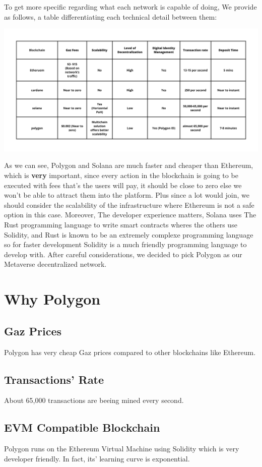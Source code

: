 To get more specific regarding what each network is capable of doing, We provide as follows, a table differentiating each technical detail between them:


\includegraphics[width=1\textwidth, inner]{assets/comparaison.png}

As we can see, Polygon and Solana are much faster and cheaper than Ethereum, which is \textbf{very} important, since every action in the blockchain is going to be executed with fees that's the users will pay, it should be close to zero else we won't be able to attract them into the platform. Plus since a lot would join, we should consider the scalability of the infrastructure where Ethereum is not a safe option in this case. Moreover, The developer experience matters, Solana uses The Rust programming language to write smart contracts wheres the others use Solidity, and Rust is known to be an extremely complexe programming language so for faster development Solidity is a much friendly programming language to develop with. 
\bigskip
After careful considerations, we decided to pick Polygon as our Metaverse decentralized network. 

\section{Why Polygon}
\subsection{Gaz Prices}
Polygon has very cheap Gaz prices compared to other blockchains like Ethereum.

\subsection{Transactions' Rate}
About 65,000 transactions are beeing mined every second.

\subsection{EVM Compatible Blockchain}
Polygon runs on the Ethereum Virtual Machine using Solidity which is very developer friendly. In fact, its' learning curve is exponential.

